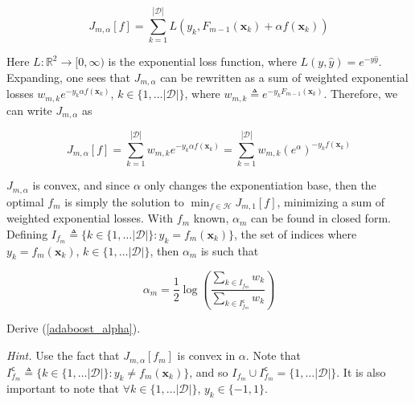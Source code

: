 \documentclass{article}
\numberwithin{equation}{section}
\begin{document}
\begin{enumerate}
    \begin{equation*}
        J_{m, \alpha}[f] = \sum_{k = 1}^{|\mathcal{D}|}
        L(y_k, F_{m - 1}(\mathbf{x}_k) + \alpha f(\mathbf{x}_k))
    \end{equation*}

    Here $ L : \mathbb{R}^2 \rightarrow [0, \infty) $ is the exponential loss
    function, where $ L(y, \hat{y}) = e^{-y\hat{y}} $. Expanding, one sees that
    $ J_{m ,\alpha} $ can be rewritten as a sum of weighted exponential
    losses $ w_{m, k}e^{-y_k\alpha f(\mathbf{x}_k)} $,
    $ k \in \{1, \ldots |\mathcal{D}|\} $, where $ w_{m, k} \triangleq
    e^{-y_kF_{m - 1}(\mathbf{x}_k)} $. Therefore, we can write $ J_{m, \alpha} $
    as

    \begin{equation*}
        J_{m, \alpha}[f] = \sum_{k = 1}^{|\mathcal{D}|}w_{m, k}
        e^{-y_k\alpha f(\mathbf{x}_k)} =
        \sum_{k = 1}^{|\mathcal{D}|}w_{m, k}(e^\alpha)^{-y_kf(\mathbf{x}_k)}
    \end{equation*}

    $ J_{m, \alpha} $ is convex, and since $ \alpha $ only changes the
    exponentiation base, then the optimal $ f_m $ is simply the solution to
    $ \min_{f \in \mathcal{H}}J_{m, 1}[f] $, minimizing a sum of weighted
    exponential losses. With $ f_m $ known, $ \alpha_m $ can be found in closed
    form. Defining
    $ I_{f_m} \triangleq \{k \in \{1, \ldots |\mathcal{D}|\} :
    y_k = f_m(\mathbf{x}_k)\} $, the set of indices where
    $ y_k = f_m(\mathbf{x}_k) $, $ k \in \{1, \ldots |\mathcal{D}|\} $, then
    $ \alpha_m $ is such that

    \begin{equation} \label{adaboost_alpha}
        \alpha_m = \frac{1}{2}\log\left(
            \frac{\sum_{k \in I_{f_m}}w_k}{\sum_{k \in I_{f_m}^\mathsf{c}}w_k}
        \right)
    \end{equation}

    Derive (\ref{adaboost_alpha}).

    \medskip

    \textit{Hint.} Use the fact that $ J_{m, \alpha}[f_m] $ is convex in
    $ \alpha $. Note that $ I_{f_m}^\mathsf{c} \triangleq
    \{k \in \{1, \ldots |\mathcal{D}|\} : y_k \ne f_m(\mathbf{x}_k)\} $, and so
    $ I_{f_m} \cup I_{f_m}^\mathsf{c} = \{1, \ldots |\mathcal{D}|\} $. It is
    also important to note that $ \forall k \in \{1, \ldots |\mathcal{D}|\} $,
    $ y_k \in \{-1, 1\} $.

\end{enumerate}
\end{document}

